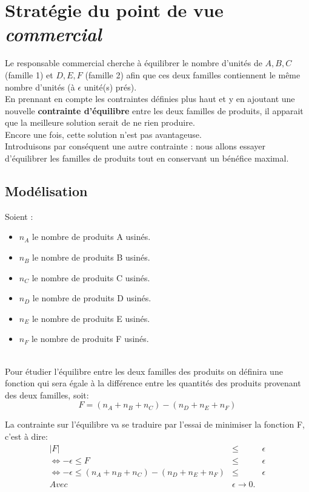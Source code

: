 \section{Stratégie du point de vue \textsl{commercial}}
\label{monocrit_resp_com}
Le responsable commercial cherche à équilibrer le nombre
d'unités de ${A, B, C}$ (famille 1) et ${D, E, F}$ (famille 2) afin que ces deux
familles contiennent le même nombre d'unités (à $\epsilon$ unité(s) prés).
~\\
En prennant en compte les contraintes définies plus haut et y en ajoutant une nouvelle
\textbf{contrainte d'équilibre} entre les deux familles de produits, il apparait que
la meilleure solution serait de ne rien produire.\\
Encore une fois, cette solution n'est pas avantageuse.\\
Introduisons par conséquent une autre contrainte : nous allons 
essayer d'équilibrer les familles de produits tout en conservant un bénéfice
maximal. 

\subsection{Modélisation}
Soient :
\begin{itemize}
	\item $n_A$ le nombre de produits A usinés. 
	\item $n_B$ le nombre de produits B usinés. 
	\item $n_C$ le nombre de produits C usinés. 
	\item $n_D$ le nombre de produits D usinés. 
	\item $n_E$ le nombre de produits E usinés. 
	\item $n_F$ le nombre de produits F usinés. 
\end{itemize}
~\\
Pour étudier l'équilibre entre les deux familles des produits on définira une
fonction qui sera égale à la différence entre les quantités des produits
provenant des deux familles, soit: 
\begin{displaymath}
	F = (n_A+n_B+n_C)-(n_D+n_E+n_F)
\end{displaymath}

La contrainte sur l'équilibre va se traduire par l'essai de minimiser la
fonction F, c'est à dire:
\begin{eqnarray*}
	|F| &\leq& \epsilon\\
	\Leftrightarrow -\epsilon \leq F &\leq& \epsilon\\
	\Leftrightarrow -\epsilon \leq (n_A+n_B+n_C)-(n_D+n_E+n_F)
	&\leq& \epsilon\\
	Avec& \epsilon \rightarrow 0.\\
\end{eqnarray*} 

